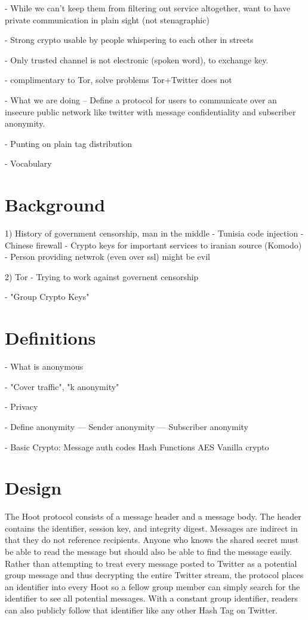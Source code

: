 \documentclass{acm_proc_article-sp}
\begin{document}
- While we can't keep them from filtering out service altogether, want to have private communication in plain sight (not stenagraphic)

- Strong crypto usable by people whispering to each other in streets

- Only trusted channel is not electronic (spoken word), to exchange key.


- complimentary to Tor, solve problems Tor+Twitter does not




- What we are doing
-- Define a protocol for users to communicate over an insecure public network like twitter with message confidentiality and subscriber anonymity. 

- Punting on plain tag distribution

- Vocabulary

\section{Background}

1) History of government censorship, man in the middle
	- Tunisia code injection
	- Chinese firewall
	- Crypto keys for important services to iranian source (Komodo)
	- Person providing netwrok (even over ssl) might be evil

2) Tor
	- Trying to work against governent censorship
	
- "Group Crypto Keys"
	
\section{Definitions}

- What is anonymous

- "Cover traffic", "k anonymity"

- Privacy

- Define anonymity
--- Sender anonymity
--- Subscriber anonymity

- Basic Crypto:
	Message auth codes
	Hash Functions
	AES
	Vanilla crypto

\section{Design}

The Hoot protocol consists of a message header and a message body. The header contains the identifier, session key, and integrity digest. Messages are indirect in that they do not reference recipients. Anyone who knows the shared secret must be able to read the message but should also be able to find the message easily. Rather than attempting to treat every message posted to Twitter as a potential group message and thus decrypting the entire Twitter stream, the protocol places an identifier into every Hoot so a fellow group member can simply search for the identifier to see all potential messages. With a constant group identifier, readers can also publicly follow that identifier like any other Hash Tag on Twitter.
\end{document}
